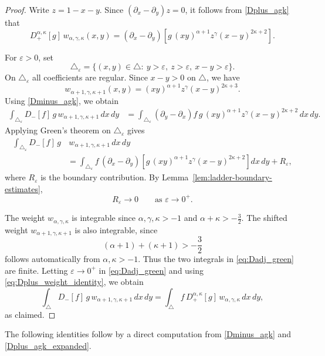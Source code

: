 \documentclass[reqno,10pt]{amsart}
\theoremstyle{plain}
\numberwithin{equation}{section}
\numberwithin{figure}{section}
\begin{document}
\begin{proof}
Write $z=1-x-y$. Since $(\partial_x-\partial_y)z=0$, it follows from
\eqref{Dplus_agk} that
\begin{equation}\label{eq:Dplus_weight_identity}
D_{+}^{\alpha,\kappa}[g]\,w_{\alpha,\gamma,\kappa}(x,y)
=
(\partial_x-\partial_y)
\left[
g\,(xy)^{\alpha+1}z^\gamma(x-y)^{2\kappa+2}
\right].
\end{equation}

For $\varepsilon>0$, set
\[
\triangle_\varepsilon
=
\{(x,y)\in\triangle:\ y>\varepsilon,\ z>\varepsilon,\ x-y>\varepsilon\}.
\]
On $\triangle_\varepsilon$ all coefficients are regular. Since $x-y>0$
on $\triangle$, we have
\[
w_{\alpha+1,\gamma,\kappa+1}(x,y)
=
(xy)^{\alpha+1}z^\gamma(x-y)^{2\kappa+3}.
\]
Using \eqref{Dminus_agk}, we obtain
\begin{align*}
\int_{\triangle_\varepsilon}
D_{-}[f]\,g\,w_{\alpha+1,\gamma,\kappa+1}\,dx\,dy
&=
\int_{\triangle_\varepsilon}
(\partial_y-\partial_x)f\,
g\,(xy)^{\alpha+1}z^\gamma(x-y)^{2\kappa+2}\,dx\,dy .
\end{align*}
Applying Green's theorem on $\triangle_\varepsilon$ gives
\begin{equation}
\begin{aligned}
\int_{\triangle_\varepsilon}
D_{-}[f]\,g&\,w_{\alpha+1,\gamma,\kappa+1}\,dx\,dy \\
&=
\int_{\triangle_\varepsilon}
f\,(\partial_x-\partial_y)
\left[
g\,(xy)^{\alpha+1}z^\gamma(x-y)^{2\kappa+2}
\right]dx\,dy
+
R_\varepsilon ,
\end{aligned}
\label{eq:Dadj_green}
\end{equation}
where $R_\varepsilon$ is the boundary contribution. By
Lemma~\ref{lem:ladder-boundary-estimates},
\[
R_\varepsilon\longrightarrow0
\qquad
\text{as }\varepsilon\to0^+.
\]

The weight $w_{\alpha,\gamma,\kappa}$ is integrable since
$\alpha,\gamma,\kappa>-1$ and $\alpha+\kappa>-\frac32$. The shifted
weight $w_{\alpha+1,\gamma,\kappa+1}$ is also integrable, since
\[
(\alpha+1)+(\kappa+1)>-\frac32
\]
follows automatically from \(\alpha,\kappa>-1\). Thus the two
integrals in \eqref{eq:Dadj_green} are finite. Letting
$\varepsilon\to0^+$ in \eqref{eq:Dadj_green} and using
\eqref{eq:Dplus_weight_identity}, we obtain
\[
\int_{\triangle}
D_{-}[f]\,g\,w_{\alpha+1,\gamma,\kappa+1}\,dx\,dy
=
\int_{\triangle}
f\,D_{+}^{\alpha,\kappa}[g]\,
w_{\alpha,\gamma,\kappa}\,dx\,dy,
\]
as claimed.
\end{proof}


The following identities follow by a direct computation from
\eqref{Dminus_agk} and \eqref{Dplus_agk_expanded}.
\end{document}
